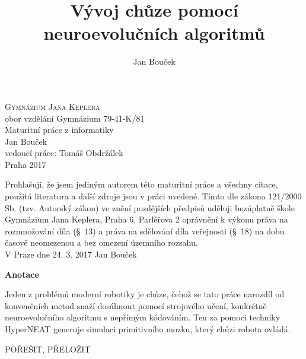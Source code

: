 \documentclass[a4]{article}
\begin{document}
 
 
\begin{titlepage} 
\begin{center} 
{\Huge\textsc{Gymnázium Jana Keplera}\\} 
{\large{obor vzdělání Gymnázium 79-41-K/81}\\[0.7cm]} 
{\huge{Maturitní práce z informatiky}\\[0.5cm]} 
{\Large{Jan Bouček}\\} 
{\large{vedoucí práce: Tomáš Obdržálek}\\} 
{\large{Praha 2017}} 
\end{center} 
\end{titlepage} 
 
\newpage 
Prohlašuji, že jsem jediným autorem této maturitní práce a všechny citace, použitá literatura a další zdroje jsou v práci uvedené. Tímto dle zákona 121/2000 Sb. (tzv. Autorský zákon) ve znění pozdějších předpisů uděluji bezúplatně škole Gymnázium Jana Keplera, Praha 6, Parléřova 2 oprávnění k výkonu práva na rozmnožování díla (§~13) a práva na sdělování díla veřejnosti (§~18) na dobu časově neomezenou a bez omezení územního rozsahu.\\[0.7cm] 
\vspace{10cm} 
{\large{V Praze dne 24. 3. 2017} \hfill Jan Bouček} 
\newpage 
{\Large\textbf{Anotace}\par}
Jeden z problémů moderní robotiky je chůze, čehož se tato práce narozdíl od konvenčních metod snaží dosáhnout pomocí strojového učení, konkrétně neuroevolučního algoritmu s nepřímým kódováním. Ten za pomoci techniky HyperNEAT generuje simulaci primitivního mozku, který chůzi robota ovládá.\par 
 
{\Huge{POŘEŠIT, PŘELOŽIT}} 
\title{Vývoj chůze pomocí neuroevolučních algoritmů} 
\author{Jan Bouček} 
\date{} 
\maketitle 
 
\end{document}
